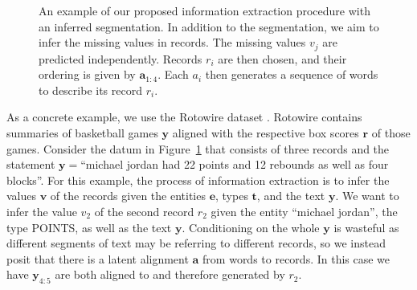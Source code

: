 \documentclass[12pt]{article}
\newcommand{\ba}{\mathbf{a}}
\newcommand{\be}{\mathbf{e}}
\newcommand{\br}{\mathbf{r}}
\newcommand{\bt}{\mathbf{t}}
\newcommand{\bv}{\mathbf{v}}
\newcommand{\by}{\mathbf{y}}
\begin{document}
\begin{figure}[h]

\caption{An example of our proposed information extraction procedure
with an inferred segmentation.
In addition to the segmentation, we aim to infer the missing values in records.
The missing values $v_j$ are predicted independently.
Records $r_i$ are then chosen, and their ordering is given by $\ba_{1:4}$.
Each $a_i$ then generates a sequence of words to describe its record $r_i$.}
\label{fig:d2t}
\end{figure}

As a concrete example, we use the Rotowire dataset \citep{wiseman2017d2t}.
Rotowire contains summaries of basketball games $\by$ aligned with the respective
box scores $\br$ of those games.
Consider the datum in Figure~\ref{fig:d2t} that consists of three records
and the statement $\by = $``michael jordan had 22 points and 12 rebounds as well as four blocks''.
For this example, the process of information extraction is to infer 
the values $\bv$ of the records given the entities $\be$, types $\bt$, and the text $\by$.
We want to infer the value $v_2$ of the second record $r_2$ given 
the entity ``michael jordan'', the type POINTS, as well as the text $\by$.
Conditioning on the whole $\by$ is wasteful as different segments of text
may be referring to different records, so we instead posit that there is a 
latent alignment $\ba$ from words to records.
In this case we have $\by_{4:5}$ are both aligned to and therefore generated by $r_2$.
\end{document}

